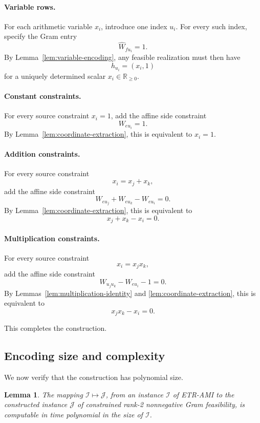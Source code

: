 \documentclass[11pt]{article}
\newtheorem{lemma}[theorem]{Lemma}
\begin{document}
\paragraph{Variable rows.}
For each arithmetic variable \(x_i\), introduce one index \(u_i\). For every
such index, specify the Gram entry
\[
\widehat{W}_{f u_i}=1.
\]
By Lemma~\ref{lem:variable-encoding}, any feasible realization must then have
\[
h_{u_i}=(x_i,1)
\]
for a uniquely determined scalar \(x_i \in \mathbb{R}_{\ge 0}\).

\paragraph{Constant constraints.}
For every source constraint \(x_i=1\), add the affine side constraint
\[
W_{e u_i}=1.
\]
By Lemma~\ref{lem:coordinate-extraction}, this is equivalent to \(x_i=1\).

\paragraph{Addition constraints.}
For every source constraint
\[
x_i=x_j+x_k,
\]
add the affine side constraint
\[
W_{e u_j}+W_{e u_k}-W_{e u_i}=0.
\]
By Lemma~\ref{lem:coordinate-extraction}, this is equivalent to
\[
x_j+x_k-x_i=0.
\]

\paragraph{Multiplication constraints.}
For every source constraint
\[
x_i=x_jx_k,
\]
add the affine side constraint
\[
W_{u_j u_k}-W_{e u_i}-1=0.
\]
By Lemmas~\ref{lem:multiplication-identity} and
\ref{lem:coordinate-extraction}, this is equivalent to
\[
x_jx_k-x_i=0.
\]

This completes the construction.

\subsection{Encoding size and complexity}
\label{subsec:size}

We now verify that the construction has polynomial size.

\begin{lemma}
\label{lem:size}
The mapping \(\mathcal{I}\mapsto \mathcal{J}\), from an instance
\(\mathcal{I}\) of \textsc{ETR-AMI} to the constructed instance
\(\mathcal{J}\) of constrained rank-2 nonnegative Gram feasibility, is
computable in time polynomial in the size of \(\mathcal{I}\).
\end{lemma}
\end{document}
